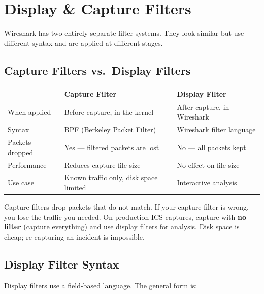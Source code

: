 \documentclass[12pt,twoside,openright]{memoir}
\begin{document}
\chapter{Display \& Capture Filters}

Wireshark has two entirely separate filter systems. They look similar but use different syntax and are applied at different stages.

\section{Capture Filters vs.\ Display Filters}

\begin{center}
\begin{tabular}{L{3cm}L{5.5cm}L{4cm}}
\toprule
{}
\textbf{} & \textbf{Capture Filter} & \textbf{Display Filter} \\
\midrule
When applied & Before capture, in the kernel & After capture, in Wireshark \\
Syntax & BPF (Berkeley Packet Filter) & Wireshark filter language \\
Packets dropped & Yes --- filtered packets are lost & No --- all packets kept \\
Performance & Reduces capture file size & No effect on file size \\
Use case & Known traffic only, disk space limited & Interactive analysis \\
\bottomrule
\end{tabular}
\end{center}

\begin{warningbox}
Capture filters drop packets that do not match. If your capture filter is wrong, you lose the traffic you needed. On production ICS captures, capture with \textbf{no filter} (capture everything) and use display filters for analysis. Disk space is cheap; re-capturing an incident is impossible.
\end{warningbox}

\section{Display Filter Syntax}

Display filters use a field-based language. The general form is:
\end{document}
